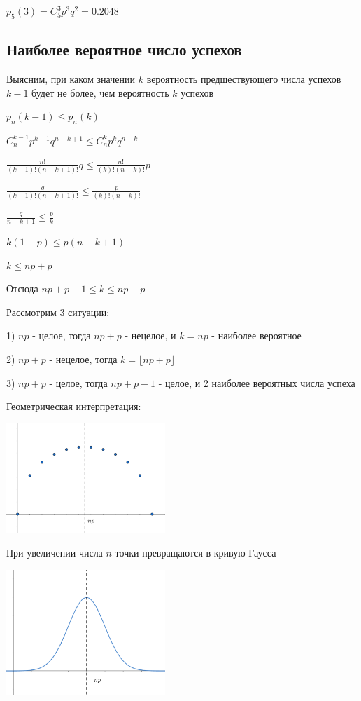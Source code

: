 \documentclass[12pt]{article}
\begin{document}
    $p_5(3) = C^3_5 p^3 q^2 = 0.2048$

    \subsection{Наиболее вероятное число успехов}

    Выясним, при каком значении $k$ вероятность предшествующего числа успехов $k - 1$ будет не более, чем вероятность $k$ успехов

    $p_n(k - 1) \leq p_n(k)$

    $C_n^{k - 1} p^{k - 1} q^{n - k + 1} \leq C^k_n p^k q^{n - k}$

    $\frac{n!}{(k - 1)! (n - k + 1)!} q \leq \frac{n!}{(k)! (n - k)!} p$

    $\frac{q}{(k - 1)! (n - k + 1)!} \leq \frac{p}{(k)! (n - k)!}$

    $\frac{q}{n - k + 1} \leq \frac{p}{k}$

    $k(1 - p) \leq p(n - k + 1)$

    $k \leq np + p$

    Отсюда $np + p - 1 \leq k \leq  np + p$

    Рассмотрим 3 ситуации:

    1) $np$ - целое, тогда $np + p$ - нецелое, и $k = np$ - наиболее вероятное

    2) $np + p$ - нецелое, тогда $k = \lfloor np + p \rfloor$

    3) $np + p$ - целое, тогда $np + p - 1$ - целое, и 2 наиболее вероятных числа успеха

    Геометрическая интерпретация:

    \begin{center}
        \includegraphics[width=6cm]{probtheory/images/probtheory_2024_09_24_1}
    \end{center}

    При увеличении числа $n$ точки превращаются в кривую Гаусса

    \begin{center}
        \includegraphics[width=6cm]{probtheory/images/probtheory_2024_09_24_2}
    \end{center}
\end{document}
